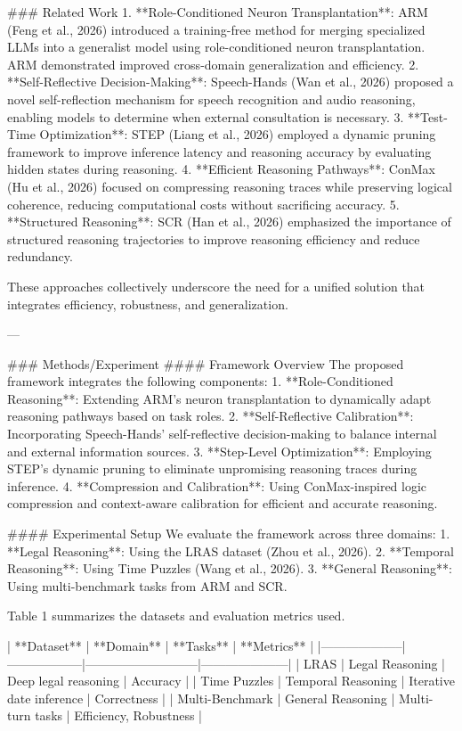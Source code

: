 ### Related Work  
1. **Role-Conditioned Neuron Transplantation**: ARM (Feng et al., 2026) introduced a training-free method for merging specialized LLMs into a generalist model using role-conditioned neuron transplantation. ARM demonstrated improved cross-domain generalization and efficiency.  
2. **Self-Reflective Decision-Making**: Speech-Hands (Wan et al., 2026) proposed a novel self-reflection mechanism for speech recognition and audio reasoning, enabling models to determine when external consultation is necessary.  
3. **Test-Time Optimization**: STEP (Liang et al., 2026) employed a dynamic pruning framework to improve inference latency and reasoning accuracy by evaluating hidden states during reasoning.  
4. **Efficient Reasoning Pathways**: ConMax (Hu et al., 2026) focused on compressing reasoning traces while preserving logical coherence, reducing computational costs without sacrificing accuracy.  
5. **Structured Reasoning**: SCR (Han et al., 2026) emphasized the importance of structured reasoning trajectories to improve reasoning efficiency and reduce redundancy.  

These approaches collectively underscore the need for a unified solution that integrates efficiency, robustness, and generalization.

---

### Methods/Experiment  
#### Framework Overview  
The proposed framework integrates the following components:  
1. **Role-Conditioned Reasoning**: Extending ARM’s neuron transplantation to dynamically adapt reasoning pathways based on task roles.  
2. **Self-Reflective Calibration**: Incorporating Speech-Hands' self-reflective decision-making to balance internal and external information sources.  
3. **Step-Level Optimization**: Employing STEP's dynamic pruning to eliminate unpromising reasoning traces during inference.  
4. **Compression and Calibration**: Using ConMax-inspired logic compression and context-aware calibration for efficient and accurate reasoning.

#### Experimental Setup  
We evaluate the framework across three domains:  
1. **Legal Reasoning**: Using the LRAS dataset (Zhou et al., 2026).  
2. **Temporal Reasoning**: Using Time Puzzles (Wang et al., 2026).  
3. **General Reasoning**: Using multi-benchmark tasks from ARM and SCR.

Table 1 summarizes the datasets and evaluation metrics used.  

| **Dataset**        | **Domain**        | **Tasks**                  | **Metrics**         |  
|--------------------|------------------|---------------------------|---------------------|  
| LRAS               | Legal Reasoning  | Deep legal reasoning       | Accuracy            |  
| Time Puzzles       | Temporal Reasoning | Iterative date inference  | Correctness         |  
| Multi-Benchmark    | General Reasoning | Multi-turn tasks           | Efficiency, Robustness |  

